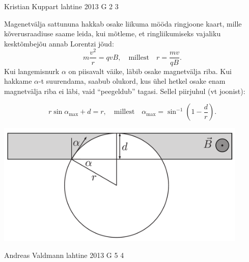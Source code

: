 \documentclass[11pt, twoside]{article}
\begin{document}
{%
{Kristian Kuppart} %
{lahtine} %
{2013} %
{G 2} %
{3} %
{

\ifSolution
Magenetvälja sattununa hakkab osake liikuma mööda ringjoone kaart, mille kõverusraadiuse saame leida, kui mõtleme, et ringliikumiseks vajaliku kesktõmbejõu annab Lorentzi jõud:
\[m\frac{v^2}{r}=qvB, \quad \text{millest} \quad r=\frac{mv}{qB}.\]
Kui langemisnurk $\alpha$ on piisavalt väike, läbib osake magnetvälja riba. Kui hakkame $\alpha$-t
suurendama, saabub olukord, kus ühel hetkel osake enam magnetvälja riba ei läbi, vaid ``peegeldub'' tagasi. Sellel piirjuhul (vt joonist):

\[r\sin\alpha_\text{max}+d=r, \quad \text{millest} \quad \alpha_\text{max}=\sin^{-1}\left(1-\frac{d}{r}\right).\]

\begin{center}
\includegraphics[width=0.9\textwidth]{2013-lahg-02-magPeegLah.pdf}
\end{center}
\fi
}

{Andreas Valdmann} %
{lahtine} %
{2013} %
{G 5} %
{4} %
{

}}
\end{document}
